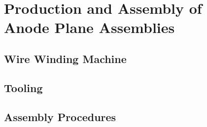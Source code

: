 \chapter{Production and Assembly of Anode Plane Assemblies}
\label{ch:fdsp-apa-prod-assy}

\section{Wire Winding Machine}
\label{sec:fdsp-apa-winding}


\section{Tooling}
\label{sec:fdsp-apa-tooling}


\section{Assembly Procedures}
\label{sec:fdsp-apa-assy}




